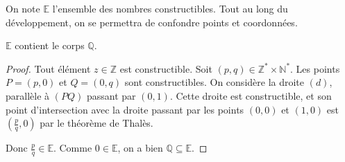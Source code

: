 




  \begin{notation}
    On note $\mathbb{E}$ l'ensemble des nombres constructibles. Tout au long du développement, on se permettra de confondre points et coordonnées.
  \end{notation}


  \begin{lemma}
    \label{theoreme-de-wantzel-1}
    $\mathbb{E}$ contient le corps $\mathbb{Q}$.
  \end{lemma}

  \begin{proof}
    Tout élément $z \in \mathbb{Z}$ est constructible. Soit $(p,q) \in \mathbb{Z}^* \times \mathbb{N}^*$. Les points $P = (p,0)$ et $Q = (0,q)$ sont constructibles. On considère la droite $(d)$, parallèle à $(PQ)$ passant par $(0,1)$. Cette droite est constructible, et son point d'intersection avec la droite passant par les points $(0,0)$ et $(1,0)$ est $\left( \frac{p}{q}, 0 \right)$ par le théorème de Thalès.
    \begin{center}
    \end{center}
    Donc $\frac{p}{q} \in \mathbb{E}$. Comme $0 \in \mathbb{E}$, on a bien $\mathbb{Q} \subseteq \mathbb{E}$.
  \end{proof}

